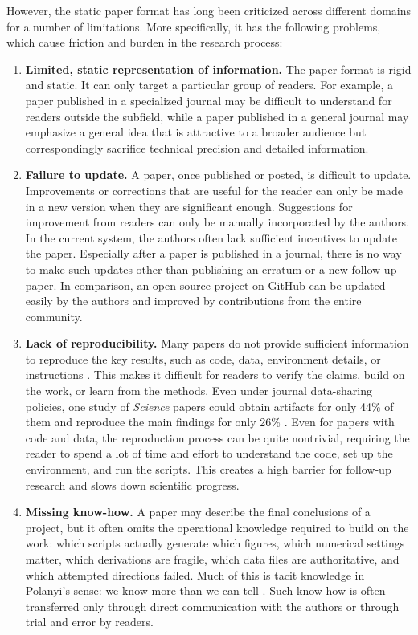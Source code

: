 \documentclass{article}
\begin{document}
However, the static paper format has long been criticized across different domains for a number of limitations. More specifically, it has the following problems, which cause friction and burden in the research process:
\begin{enumerate}
    \item \textbf{Limited, static representation of information.} The paper format is rigid and static. It can only target a particular group of readers. For example, a paper published in a specialized journal may be difficult to understand for readers outside the subfield, while a paper published in a general journal may emphasize a general idea that is attractive to a broader audience but correspondingly sacrifice technical precision and detailed information.
    \item \textbf{Failure to update.} A paper, once published or posted, is difficult to update. Improvements or corrections that are useful for the reader can only be made in a new version when they are significant enough. Suggestions for improvement from readers can only be manually incorporated by the authors. In the current system, the authors often lack sufficient incentives to update the paper. Especially after a paper is published in a journal, there is no way to make such updates other than publishing an erratum or a new follow-up paper. In comparison, an open-source project on GitHub can be updated easily by the authors and improved by contributions from the entire community.
    \item \textbf{Lack of reproducibility.} Many papers do not provide sufficient information to reproduce the key results, such as code, data, environment details, or instructions \cite{baker2016reproducibility,peng2011reproducible}. This makes it difficult for readers to verify the claims, build on the work, or learn from the methods. Even under journal data-sharing policies, one study of \emph{Science} papers could obtain artifacts for only 44\% of them and reproduce the main findings for only 26\% \cite{stodden2018empirical}. Even for papers with code and data, the reproduction process can be quite nontrivial, requiring the reader to spend a lot of time and effort to understand the code, set up the environment, and run the scripts. This creates a high barrier for follow-up research and slows down scientific progress.
    \item \textbf{Missing know-how.} A paper may describe the final conclusions of a project, but it often omits the operational knowledge required to build on the work: which scripts actually generate which figures, which numerical settings matter, which derivations are fragile, which data files are authoritative, and which attempted directions failed. Much of this is tacit knowledge in Polanyi's sense: we know more than we can tell \cite{polanyi2009tacit}. Such know-how is often transferred only through direct communication with the authors or through trial and error by readers.
\end{enumerate}
\end{document}

